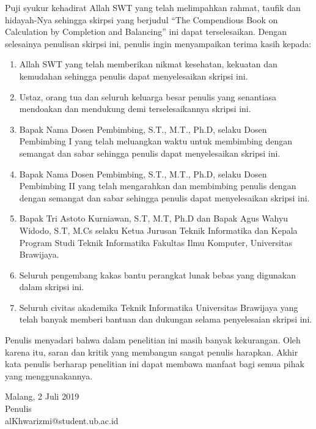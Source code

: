 \documentclass{skripsi}
\begin{document}
{\preface

  Puji syukur kehadirat Allah SWT yang telah melimpahkan rahmat,
  taufik dan hidayah-Nya sehingga skirpsi yang berjudul ``The Compendious Book
  on Calculation by Completion and Balancing'' ini dapat terselesaikan. Dengan
  selesainya penulisan skirpsi ini, penulis ingin menyampaikan terima kasih
  kepada:

  \begin{singlespace}
    \begin{enumerate}
  \item{Allah SWT yang telah memberikan nikmat kesehatan, kekuatan dan
      kemudahan sehingga penulis dapat menyelesaikan skripsi ini.}
  \item{Ustaz, orang tua dan seluruh keluarga besar penulis yang
      senantiasa mendoakan dan mendukung demi terselesaikannya skripsi
      ini.}
  \item{Bapak Nama Dosen Pembimbing, S.T., M.T., Ph.D, selaku Dosen Pembimbing I
      yang telah meluangkan waktu untuk membimbing dengan semangat dan
      sabar sehingga penulis dapat menyelesaikan skripsi ini.}
  \item{Bapak Nama Dosen Pembimbing, S.T., M.T., Ph.D, selaku
      Dosen Pembimbing II yang telah mengarahkan dan membimbing
      penulis dengan dengan semangat dan sabar sehingga penulis dapat
      menyelesaikan skripsi ini.}
  \item {Bapak Tri Astoto Kurniawan, S.T, M.T, Ph.D dan Bapak Agus
      Wahyu Widodo, S.T, M.Cs selaku Ketua Jurusan Teknik Informatika
      dan Kepala Program Studi Teknik Informatika Fakultas Ilmu
      Komputer, Universitas Brawijaya.}
  \item{Seluruh pengembang kakas bantu perangkat lunak bebas yang
      digunakan dalam skripsi ini.}
  \item{Seluruh civitas akademika Teknik Informatika Universitas
      Brawijaya yang telah banyak memberi bantuan dan dukungan selama
      penyelesaian skripsi ini.}
  \end{enumerate}
  \end{singlespace}

  Penulis menyadari bahwa dalam penelitian ini masih banyak
  kekurangan. Oleh karena itu, saran dan kritik yang membangun sangat
  penulis harapkan. Akhir kata penulis berharap penelitian ini dapat
  membawa manfaat bagi semua pihak yang menggunakannya.

  \vspace{0.8cm}

  \noindent
  \hspace*{8cm}Malang, 2 Juli 2019  \vspace{1.5cm} \\

  \hspace*{6.8cm}Penulis \\
  \hspace*{8cm}alKhwarizmi@student.ub.ac.id
}
\end{document}
